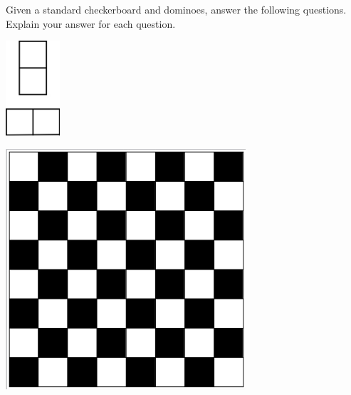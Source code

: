 \documentclass[addpoints]{exam}
\begin{document}
\begin{questions}
  \begin{minipage}{0.5 \linewidth}
    Given a standard checkerboard and dominoes, answer the following questions. Explain your answer for each question.
    \begin{center}
      \includegraphics[width= 0.15\textwidth]{dominos}
    \end{center}
  \end{minipage} 
  \begin{minipage}{0.5 \linewidth}\begin{center}
      \includegraphics[width=0.6 \textwidth]{checkerboard} \end{center}
  \end{minipage}
\end{questions}
\end{document}

